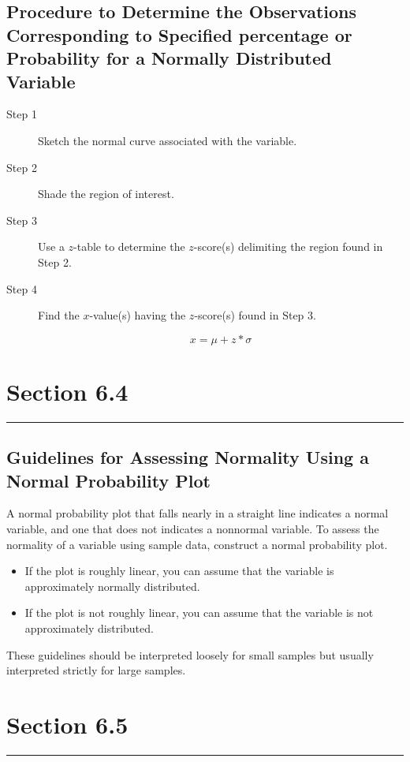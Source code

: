 \documentclass[12pt]{article}
\begin{document}
        \subsection*{Procedure to Determine the Observations Corresponding to Specified
        percentage or Probability for a Normally Distributed Variable}
            \begin{description}
                \item[Step 1] Sketch the normal curve associated with the variable.
                \item[Step 2] Shade the region of interest.
                \item[Step 3] Use a $z$-table to determine the $z$-score(s) delimiting the region
                found in Step 2.
                \item[Step 4] Find the $x$-value(s) having the $z$-score(s) found in Step 3.
                \begin{center}
                    \[
                        x = \mu + z * \sigma
                    \]
                \end{center}
            \end{description}
        
    \section[]{Section 6.4}
    \noindent\rule{\textwidth}{0.4pt}
        \subsection*{Guidelines for Assessing Normality Using a Normal Probability Plot}
            A normal probability plot that falls nearly in a straight line indicates a normal
            variable, and one that does not indicates a nonnormal variable. To assess the
            normality of a variable using sample data, construct a normal probability plot.
            \begin{itemize}
                \item If the plot is roughly linear, you can assume that the variable is
                approximately normally distributed.
                \item If the plot is not roughly linear, you can assume that the variable is not
                approximately distributed.
            \end{itemize}
            These guidelines should be interpreted loosely for small samples but usually
            interpreted strictly for large samples.

    \section[]{Section 6.5}
    \noindent\rule{\textwidth}{0.4pt}
        \subsection*{}
\end{document}
